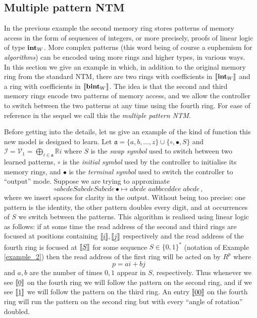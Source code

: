 \documentclass[english,letter paper,12pt,leqno]{article}
\theoremstyle{example}
\numberwithin{equation}{section}
\def\be{\begin{equation}}
\def\ee{\end{equation}}
\begin{document}
\subsection{Multiple pattern NTM}\label{example:ntm_super}

In the previous example the second memory ring stores patterns of memory access in the form of sequences of integers, or more precisely, proofs of linear logic of type $\textbf{int}_W$. More complex patterns (this word being of course a euphemism for \emph{algorithms}) can be encoded using more rings and higher types, in various ways. In this section we give an example in which, in addition to the original memory ring from the standard NTM, there are two rings with coefficients in $\llbracket \textbf{int}_W \rrbracket$ and a ring with coefficients in $\llbracket \textbf{bint}_W \rrbracket$. The idea is that the second and third memory rings encode two patterns of memory access, and we allow the controller to switch between the two patterns at any time using the fourth ring. For ease of reference in the sequel we call this the \emph{multiple pattern NTM}.

Before getting into the details, let us give an example of the kind of function this new model is designed to learn. Let $\mathfrak{a} = \{a,b,\ldots,z\} \cup \{\circ, \bullet, S\}$ and $\mathscr{I} = \mathscr{V}_1 = \bigoplus_{i \in \mathfrak{a}} \mathbb{R} i$ where $S$ is the \emph{swap symbol} used to switch between two learned patterns, $\circ$ is the \emph{initial symbol} used by the controller to initialise its memory rings, and $\bullet$ is the \emph{terminal symbol} used to switch the controller to ``output'' mode. Suppose we are trying to approximate
\be\label{eq:example_seq_func}
\circ abcde S abcde S abcde \,\bullet \longmapsto abcde \; aabbccddee \; abcde\,,
\ee
where we insert spaces for clarity in the output. Without being too precise: one pattern is the identity, the other pattern doubles every digit, and at occurrences of $S$ we switch between the patterns. This algorithm is realised using linear logic as follows: if at some time the read address of the second and third rings are focused at positions containing $\llbracket \underline{i} \rrbracket, \llbracket \underline{j} \rrbracket$ respectively and the read address of the fourth ring is focused at $\llbracket \underline{S} \rrbracket$ for some sequence $S \in \{0,1\}^*$ (notation of Example \ref{example_2}) then the read address of the first ring will be acted on by $R^p$ where
\[
p = ai + bj
\]
and $a, b$ are the number of times $0,1$ appear in $S$, respectively. Thus whenever we see $\llbracket \underline{0} \rrbracket$ on the fourth ring we will follow the pattern on the second ring, and if we see $\llbracket \underline{1} \rrbracket$ we will follow the pattern on the third ring. An entry $\llbracket \underline{00} \rrbracket$ on the fourth ring will run the pattern on the second ring but with every ``angle of rotation'' doubled. 
\end{document}
